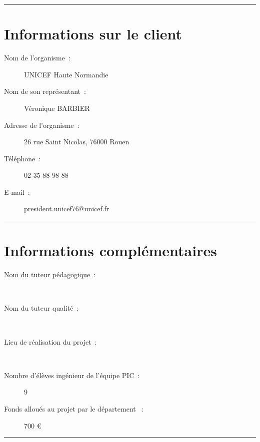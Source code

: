 					


	\vspace{1cm}
	\noindent\hfil\rule{\textwidth}{.4pt}\hfil
	\vspace{1cm}	
	
	
\section*{Informations sur le client}
	\begin{description}
		\item[Nom de l'organisme~:] UNICEF Haute Normandie \\
		\item[Nom de son représentant~:] Véronique BARBIER \\
		\item[Adresse de l'organisme~:] 26 rue Saint Nicolas, 76000 Rouen \\
		\item[Téléphone~:] 02 35 88 98 88 \\
		\item[E-mail~:] president.unicef76@unicef.fr \\
	\end{description}
	
	
	\vspace{1cm}
	\noindent\hfil\rule{\textwidth}{.4pt}\hfil
	\vspace{1cm}	
	
\section*{Informations complémentaires}
	
	\begin{description}
	
		\item[Nom du tuteur pédagogique~:] \nomTuteurPedago \\
		\item[Nom du tuteur qualité~:] \nomTuteurQualite \\
		\item[Lieu de réalisation du projet~:] \adresseSalle \\
		\item[Nombre d'élèves ingénieur de l'équipe 
PIC~:] 9 \\
		\item[Fonds alloués au projet par le département \ASICourt{}~:] 700 \euro{}
	\end{description}	
	
	\noindent\hfil\rule{\textwidth}{.4pt}\hfil	
	
